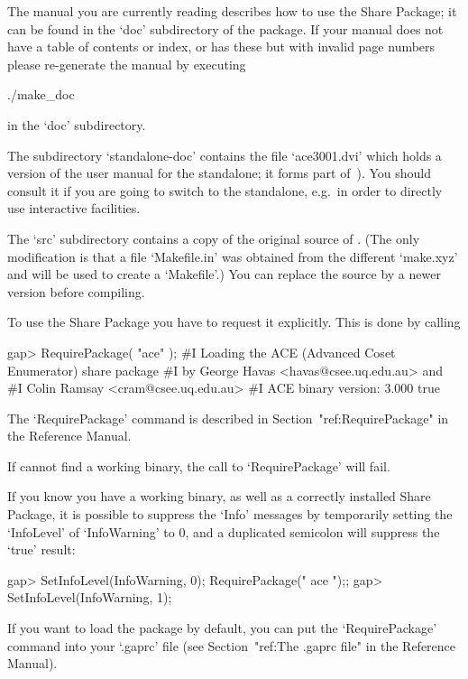 The manual you are currently reading describes how to use  the  {\ACE}
Share Package; it can be  found  in  the  `doc'  subdirectory  of  the
package. If your manual does not have a table of contents or index, or
has these but with invalid page numbers please re-generate the  manual
by executing

\begintt
./make_doc
\endtt

in the `doc' subdirectory.

The  subdirectory  `standalone-doc'  contains the  file  `ace3001.dvi'
which holds a version of the user manual for the {\ACE} standalone; it
forms part of~\cite{Ram99}).  You  should consult it if  you are going
to  switch to  the {\ACE}  standalone, e.g.~in  order to  directly use
interactive facilities.

The  `src' subdirectory  contains a  copy  of the  original source  of
{\ACE}.  (The  only modification  is  that  a  file `Makefile.in'  was
obtained from  the different `make.xyz' and  will be used  to create a
`Makefile'.)  You  can replace  the source by  a newer  version before
compiling.


To use the {\ACE} Share Package you have  to  request  it  explicitly.
This is done by calling

\beginexample
gap> RequirePackage( "ace" );
#I  Loading the ACE (Advanced Coset Enumerator) share package
#I           by George Havas <havas@csee.uq.edu.au> and
#I              Colin Ramsay <cram@csee.uq.edu.au>
#I                   ACE binary version: 3.000
true
\endexample

The      `RequirePackage'      command      is      described       in
Section~"ref:RequirePackage" in the {\GAP} Reference Manual.

If {\GAP} cannot find a working binary, the call  to  `RequirePackage'
will fail.

If you know you have a working {\ACE} binary, as well as  a  correctly
installed {\ACE} Share Package, it is possible to suppress the  `Info'
messages by temporarily setting the `InfoLevel' of `InfoWarning' to 0,
and a duplicated semicolon will suppress the `true' result:

\beginexample
gap> SetInfoLevel(InfoWarning, 0); RequirePackage(" ace ");;
gap> SetInfoLevel(InfoWarning, 1);
\endexample

If you want to load the {\ACE} package by default, you  can  put   the
`RequirePackage' command into your `.gaprc' file (see Section~"ref:The
.gaprc file" in the {\GAP} Reference Manual).

